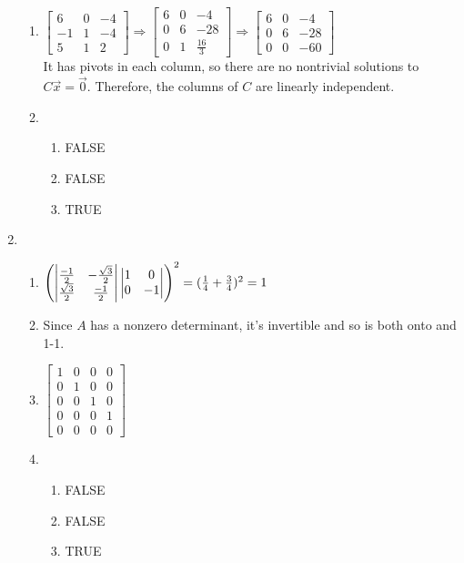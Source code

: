 \documentclass[leqno]{article}
\begin{document}
\begin{enumerate}
\begin{enumerate}
        \item
        $\begin{bmatrix}
        6 & 0 & -4 \\
        -1 & 1 & -4 \\
        5 & 1 & 2
        \end{bmatrix} \Rightarrow \begin{bmatrix}
        6 & 0 & -4 \\
        0 & 6 & -28 \\
        0 & 1 & \frac{16}{3}
        \end{bmatrix} \Rightarrow \begin{bmatrix}
        6 & 0 & -4 \\
        0 & 6 & -28 \\
        0 & 0 & -60
        \end{bmatrix}$\\
        It has pivots in each column, so there are no nontrivial solutions to $C\Vec x = \Vec 0$. Therefore, the columns of $C$ are linearly independent.
        \item
        \begin{enumerate}
            \item FALSE
            \item FALSE
            \item TRUE
        \end{enumerate}
    \end{enumerate}

    \item
    \begin{enumerate}
        \item
        $\left(\begin{vmatrix}\frac{-1}{2} & -\frac{\sqrt 3}{2} \\ \frac{\sqrt 3}{2} & \frac{-1}{2}\end{vmatrix}
        \begin{vmatrix}1 & 0 \\ 0 & -1\end{vmatrix}\right)^2 = (\frac 1 4 + \frac 3 4)^2 = 1$
        \item Since $A$ has a nonzero determinant, it's invertible and so is both onto and 1-1.
        \item $\begin{bmatrix}1 & 0 & 0 & 0 \\ 0 & 1 & 0 & 0\\ 0 & 0 & 1 & 0 \\ 0 & 0 & 0 & 1 \\ 0 & 0 & 0 & 0\end{bmatrix}$
        \item \begin{enumerate}
            \item FALSE
            \item FALSE
            \item TRUE
        \end{enumerate}
    \end{enumerate}


\end{enumerate}
\end{document}
